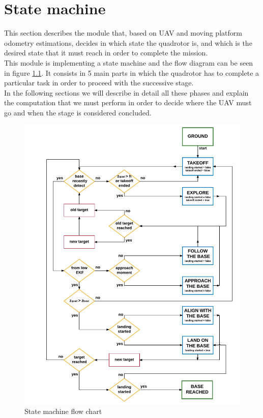 \chapter{State machine}\label{chap:area_exploration}
This section describes the module that, based on UAV and moving platform odometry estimations, decides in which state the quadrotor is, and which is the desired state that it must reach in order to complete the mission.\\
This module is implementing a state machine and the flow diagram can be seen in figure     \ref{fig:area_exploration_state_machine}. It consists in 5 main parts in which the quadrotor has to complete a particular task in order to proceed with the successive stage. \\

In the following sections we will describe in detail all these phases and explain the computation that we must perform in order to decide where the UAV must go and when the stage is considered concluded.


\begin{figure}[!htbp]
    \centering
    \includegraphics[width=1.1\textwidth]{img/state_machine.pdf}
    \caption{State machine flow chart}
    \label{fig:area_exploration_state_machine}
\end{figure}


